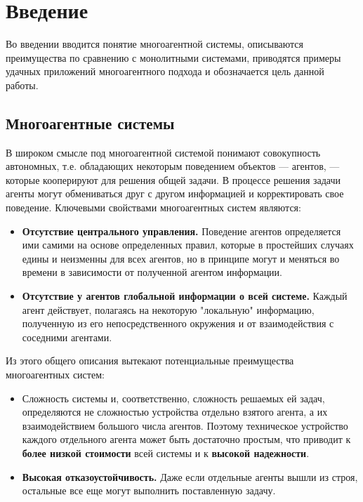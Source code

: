 \section*{Введение}					    %

Во введении вводится понятие многоагентной системы, описываются преимущества по сравнению с монолитными системами, приводятся примеры удачных приложений многоагентного подхода и обозначается цель данной работы.

\subsection*{Многоагентные системы}

В широком смысле под многоагентной системой понимают
совокупность автономных, т.е. обладающих некоторым 
поведением объектов --- агентов, --- которые кооперируют для решения общей задачи. В процессе решения
задачи агенты могут обмениваться друг с другом
информацией и корректировать свое поведение. 
Ключевыми свойствами многоагентных систем являются:
\begin{itemize}
\item \textbf{Отсутствие центрального управления.} Поведение
агентов определяется ими самими на основе определенных
правил, которые в простейших случаях едины и неизменны
для всех агентов, но в принципе могут и меняться во
времени в зависимости от полученной агентом информации.
\item \textbf{Отсутствие у агентов глобальной информации о всей
системе.} Каждый агент действует, полагаясь на некоторую
"локальную" информацию, полученную из его
непосредственного окружения и от взаимодействия с  соседними агентами.
\end{itemize}

Из этого общего описания вытекают потенциальные преимущества многоагентных систем:
\begin{itemize}
\item Сложность системы и,
 соответственно, сложность решаемых ей задач, определяются 
 не сложностью устройства 
отдельно взятого агента, а их взаимодействием большого числа агентов. 
Поэтому техническое устройство каждого отдельного агента  
может быть достаточно простым, что приводит к \textbf{более низкой стоимости} всей системы и к \textbf{высокой надежности}.
\item \textbf{Высокая отказоустойчивость.} Даже если отдельные агенты вышли из строя, остальные все еще могут выполнить поставленную задачу.
\end{itemize}

